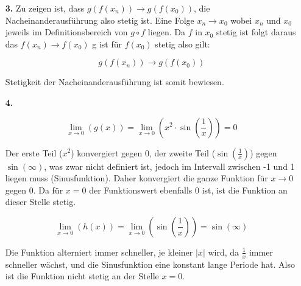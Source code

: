 \documentclass[a4paper,11pt]{scrartcl}
\newcommand{\bra}[1]{\left(#1\right)}
\begin{document}
\begin{enumerate}
\begin{enumerate}
        \end{enumerate}

    \item[\textbf{3.}]
        Zu zeigen ist, dass $g(f(x_n)) \rightarrow g(f(x_0))$, die Nacheinanderausführung also stetig ist.
        Eine Folge $x_n \rightarrow x_0$ wobei $x_n$ und $x_0$ jeweils im Definitionsbereich von $g \circ f$ liegen.
        Da $f$ in $x_0$ stetig ist folgt daraus das $f(x_n) \rightarrow f(x_0)$ g ist für $f(x_0)$ stetig
        also gilt:

        $$g(f(x_n)) \rightarrow g(f(x_0))$$

        Stetigkeit der Nacheinanderausführung ist somit bewiesen.

    \item[\textbf{4.}]

        $$\lim\limits_{x \rightarrow 0}\bra{g(x)} =
        \lim\limits_{x \rightarrow 0}\bra{x^2 \cdot \sin\bra{\frac{1}{x}}} = 0$$

        Der erste Teil ($x^2$) konvergiert gegen 0, der zweite Teil ($\sin\bra{\frac{1}{x}}$)
        gegen $\sin(\infty)$, was zwar nicht definiert ist, jedoch im Intervall
        zwischen -1 und 1 liegen muss (Sinusfunktion). Daher konvergiert die ganze Funktion
        für $x \rightarrow 0$ gegen 0. Da für $x = 0$ der Funktionswert ebenfalls
        $0$ ist, ist die Funktion an dieser Stelle stetig.

        $$\lim\limits_{x \rightarrow 0}\bra{h(x)} =
        \lim\limits_{x \rightarrow 0}\bra{\sin\bra{\frac{1}{x}}} = \sin(\infty)$$

        Die Funktion alterniert immer schneller, je kleiner $|x|$ wird, da $\frac{1}{x}$
        immer schneller wächst, und die Sinusfunktion eine konstant lange Periode
        hat. Also ist die Funktion nicht stetig an der Stelle $x = 0$.

\end{enumerate}
\end{document}
